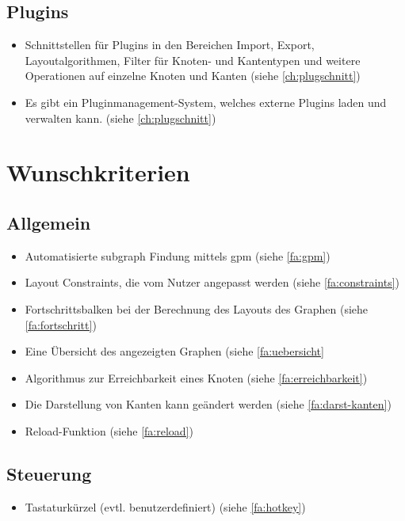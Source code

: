 \subsection{Plugins}
  \begin{itemize}
    \item Schnittstellen für Plugins in den Bereichen Import, Export, Layoutalgorithmen, Filter für Knoten- und Kantentypen und weitere Operationen auf einzelne Knoten und Kanten (siehe \autoref{ch:plugschnitt})
    \item Es gibt ein Pluginmanagement-System, welches externe Plugins laden und verwalten kann. (siehe \autoref{ch:plugschnitt})
  \end{itemize}

\section{Wunschkriterien}

\subsection{Allgemein}
  \begin{itemize}
    \item Automatisierte \gls{subgraph} Findung mittels \gls{gpm} (siehe \ref{fa:gpm})
    \item Layout Constraints, die vom Nutzer angepasst werden (siehe \ref{fa:constraints})
    \item Fortschrittsbalken bei der Berechnung des Layouts des Graphen (siehe \ref{fa:fortschritt})
    \item Eine Übersicht des angezeigten Graphen (siehe \ref{fa:uebersicht}
    \item Algorithmus zur Erreichbarkeit eines Knoten (siehe \ref{fa:erreichbarkeit})
    \item Die Darstellung von Kanten kann geändert werden (siehe \ref{fa:darst-kanten})
    \item Reload-Funktion (siehe \ref{fa:reload})
  \end{itemize}

\subsection{Steuerung}
  \begin{itemize}
    \item Tastaturkürzel (evtl. benutzerdefiniert) (siehe \ref{fa:hotkey})
  \end{itemize}

